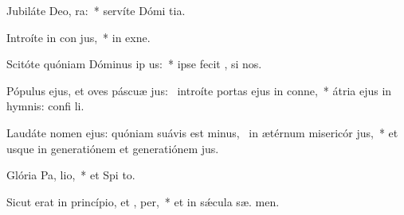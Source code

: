 \item Jubiláte Deo,  ra:~* servíte Dómi  tia.
\item Introíte in con jus,~* in exne.
\item Scitóte quóniam Dóminus ip  us:~* ipse fecit ,   si nos.
\item Pópulus ejus, et oves páscuæ jus:~\pscross{} introíte portas ejus in conne,~* átria ejus in hymnis: confi li.
\item Laudáte nomen ejus: quóniam suávis est minus,~\pscross{} in ætérnum misericór jus,~* et usque in generatiónem et generatiónem  jus.
\item Glória Pa,  lio,~* et Spi to.
\item Sicut erat in princípio, et ,  per,~* et in sǽcula sæ. men.

